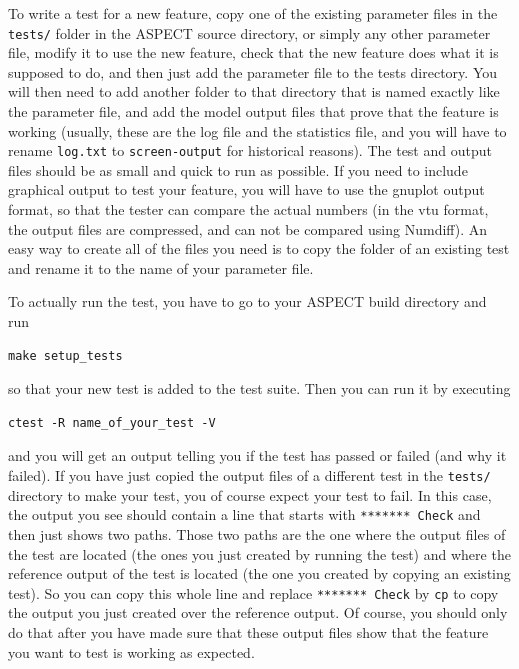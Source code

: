 \documentclass{article}
\newcommand{\aspect}{\textsc{ASPECT}}
\begin{document}
To write a test for a new feature, copy one of the existing parameter files in
the \texttt{tests/} folder in the \aspect{} source directory, or simply any other
parameter file, modify it to use the new feature, check that the
new feature does what it is supposed to do, and then just add the parameter file to
the tests directory. You will then need to add another folder to that directory
that is named exactly like the parameter file, and add the model output files that
prove that the feature is working (usually, these are the log file and the statistics
file, and you will have to rename \texttt{log.txt} to
\texttt{screen-output} for historical reasons). The test and output files should
be as small and quick to run as possible. If you need to include graphical output to
test your feature, you will have to use the gnuplot output format, so that the tester
can compare the actual numbers (in the vtu format, the output files are compressed,
and can not be compared using Numdiff).
An easy way to create all of the files you need is to copy the folder of an existing
test and rename it to the name of your parameter file.

To actually run the test, you have to go to your \aspect{} build directory and run
\begin{lstlisting}[frame=single,language=ksh]
    make setup_tests
\end{lstlisting}
so that your new test is added to the test suite. Then you can run it by executing
\begin{lstlisting}[frame=single,language=ksh]
    ctest -R name_of_your_test -V
\end{lstlisting}
and you will get an output telling you if the test has
passed or failed (and why it failed). If you have just copied the output files of a different
test in the \texttt{tests/} directory to make your test, you of course expect your test to fail.
In this case, the output you see should contain a line that starts with \texttt{******* Check}
and then just shows two paths. Those two paths are the one where the output files of the test
are located (the ones you just created by running the test) and where the reference output of the
test is located (the one you created by copying an existing test). So you can copy this whole line
and replace \texttt{******* Check} by \texttt{cp} to copy the output you just created over the
reference output. Of course, you should only do that after you have made sure that these output
files show that the feature you want to test is working as expected.
\end{document}
